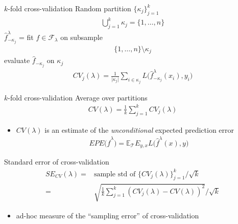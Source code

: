 \documentclass[xcolor=dvipsnames, handout]{beamer}
\newcommand{\E}{\mathbb{E}}
\begin{document}
\begin{frame}{$k$-fold cross-validation}
Random partition $\{\kappa_j\}_{j = 1}^k$
\begin{align*}
\bigcup_{j = 1}^k \kappa_j = \{1, \dotsc, n\}
\end{align*}
$\hat{f}^{\lambda}_{-\kappa_j}$ = fit $f \in \mathcal{F}_{\lambda}$ on subsample 
\begin{align*}
  \{1, \dotsc, n\} \setminus \kappa_j
\end{align*}
evaluate $\hat{f}_{-\kappa_j}$ on $\kappa_j$
\begin{align*}
  CV_j(\lambda) = \frac{1}{\lvert\kappa_j\rvert} \sum_{i \in \kappa_j} L\big(\hat{f}^{\lambda}_{-\kappa_j}(x_i), y_i \big)
\end{align*}
\end{frame}

\begin{frame}{$k$-fold cross-validation}
Average over partitions
\begin{align*}
  CV(\lambda) = \frac{1}{k} \sum_{j=1}^k CV_j(\lambda)
\end{align*}
\pause
\begin{itemize}
  \item $CV(\lambda)$ is an estimate of the \emph{unconditional} expected prediction error
    \begin{align*}
    EPE \big(\hat{f}^{\lambda}\big) = \E_{\mathcal{T}} E_{y, x} L \big(\hat{f}^{\lambda}(x), y \big)
  \end{align*}
\end{itemize}
\end{frame}

\begin{frame}{Standard error of cross-validation}
\begin{align*}
  SE_{CV}(\lambda) =& \text{sample std of $\{CV_j(\lambda)\}_{j=1}^k$}/{\sqrt{k}}
\\
  =& \sqrt{\frac{1}{k} \sum_{j=1}^k\left( CV_j(\lambda) - CV(\lambda)\right)^2}/\sqrt{k}
\end{align*}
\begin{itemize}
  \item ad-hoc measure of the ``sampling error'' of cross-validation
\end{itemize}
\end{frame}
\end{document}
